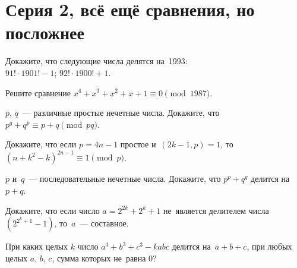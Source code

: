 

\section*{Серия 2, всё ещё сравнения, но посложнее}


\begin{problems}

\item
Докажите, что следующие числа делятся на~1993:
\\
\sbp $91! \cdot 1901! - 1$;
\qquad
\sbp $92! \cdot 1900! + 1$.

\item
Решите сравнение $x^4 + x^3 + x^2 + x + 1 \equiv 0 \pmod{1987}$.

\item
$p$, $q$~--- различные простые нечетные числа.
Докажите, что $p^q + q^p \equiv p + q \pmod{pq}$.

\medskip

\item
Докажите, что если $p = 4 n - 1$ простое и~$(2 k - 1, p) = 1$,
то~$(n + k^2 - k)^{2n-1} \equiv 1 \pmod{p}$.

\item
$p$ и~$q$~--- последовательные нечетные числа.
Докажите, что $p^p + q^q$ делится на~$p + q$.

\item
Докажите, что если число $a = 2^{2k} + 2^k + 1$ не~является делителем числа
$(2^{2^k + 1} - 1)$, то~$a$~--- составное.

\item
При каких целых $k$ число $a^3 + b^3 + c^3 - k a b c$ делится на~$a + b + c$,
при любых целых $a$, $b$, $c$, сумма которых не~равна 0?

\end{problems}

